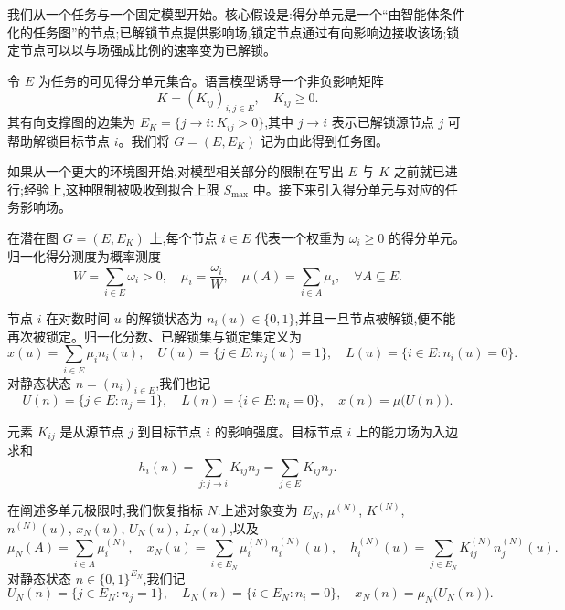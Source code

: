 我们从一个任务与一个固定模型开始。核心假设是:得分单元是一个``由智能体条件化的任务图''的节点;已解锁节点提供影响场,锁定节点通过有向影响边接收该场;锁定节点可以以与场强成比例的速率变为已解锁。

\begin{definition}[任务图]
令 $E$ 为任务的可见得分单元集合。语言模型诱导一个非负影响矩阵
\[
    K = (K_{ij})_{i,j \in E}, \quad K_{ij} \geq 0.
\]
其有向支撑图的边集为 $E_{K} = \{j \to i : K_{ij} > 0\}$,其中 $j \to i$ 表示已解锁源节点 $j$ 可帮助解锁目标节点 $i$。我们将 $G = (E, E_{K})$ 记为由此得到任务图。
\end{definition}

如果从一个更大的环境图开始,对模型相关部分的限制在写出 $E$ 与 $K$ 之前就已进行;经验上,这种限制被吸收到拟合上限 $S_{\max}$ 中。接下来引入得分单元与对应的任务影响场。

\begin{definition}[得分单元与归一化得分测度]
在潜在图 $G = (E, E_{K})$ 上,每个节点 $i \in E$ 代表一个权重为 $\omega_{i} \geq 0$ 的得分单元。归一化得分测度为概率测度
\[
    W = \sum_{i \in E} \omega_{i} > 0, \quad
    \mu_{i} = \frac{\omega_{i}}{W}, \quad
    \mu(A) = \sum_{i \in A} \mu_{i}, \quad \forall A \subseteq E.
\]
\end{definition}

\begin{definition}
节点 $i$ 在对数时间 $u$ 的解锁状态为 $n_{i}(u) \in \{0, 1\}$,并且一旦节点被解锁,便不能再次被锁定。归一化分数、已解锁集与锁定集定义为
\[
    x(u) = \sum_{i \in E} \mu_{i} n_{i}(u), \quad
    U(u) = \{j \in E : n_{j}(u) = 1\}, \quad
    L(u) = \{i \in E : n_{i}(u) = 0\}. \tag{5}
\]
对静态状态 $n = (n_{i})_{i \in E}$,我们也记
\[
    U(n) = \{j \in E : n_{j} = 1\}, \quad
    L(n) = \{i \in E : n_{i} = 0\}, \quad
    x(n) = \mu\bigl(U(n)\bigr).
\]
\end{definition}

\begin{definition}[任务影响场]
元素 $K_{ij}$ 是从源节点 $j$ 到目标节点 $i$ 的影响强度。目标节点 $i$ 上的能力场为入边求和
\[
    h_{i}(n) = \sum_{j : j \to i} K_{ij} n_{j} = \sum_{j \in E} K_{ij} n_{j}.
\]
\end{definition}

在阐述多单元极限时,我们恢复指标 $N$:上述对象变为 $E_{N}$, $\mu^{(N)}$, $K^{(N)}$, $n^{(N)}(u)$, $x_{N}(u)$, $U_{N}(u)$, $L_{N}(u)$,以及
\[
    \mu_{N}(A) = \sum_{i \in A} \mu^{(N)}_{i}, \quad
    x_{N}(u) = \sum_{i \in E_{N}} \mu^{(N)}_{i} n^{(N)}_{i}(u), \quad
    h^{(N)}_{i}(u) = \sum_{j \in E_{N}} K^{(N)}_{ij} n^{(N)}_{j}(u).
\]
对静态状态 $n \in \{0, 1\}^{E_{N}}$,我们记
\[
    U_{N}(n) = \{j \in E_{N} : n_{j} = 1\}, \quad
    L_{N}(n) = \{i \in E_{N} : n_{i} = 0\}, \quad
    x_{N}(n) = \mu_{N}\bigl(U_{N}(n)\bigr).
\]

